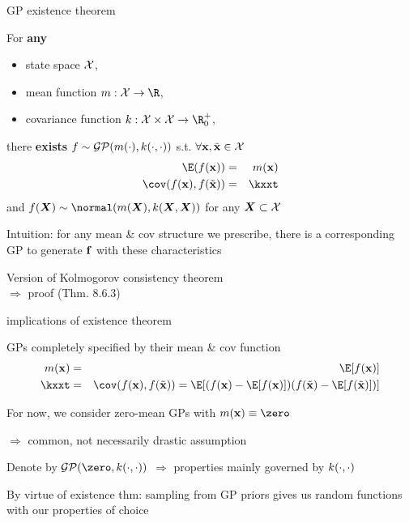 \documentclass[11pt,compress,t,notes=noshow, xcolor=table]{beamer}
\begin{document}

\begin{framei}[sep=L]{GP existence theorem}
\item For \textbf{any} 
\begin{itemize}
\item state space $\mathcal{X}$,
\item mean function $m: \Xspace \rightarrow \R$,
\item covariance function $k: \Xspace \times \Xspace \rightarrow \R^+_0$, 
\end{itemize}
\vfill
there \textbf{exists} $f \sim \mathcal{GP}(m(\cdot), k(\cdot, \cdot))$ s.t. $\forall \mathbf{x}, \tilde{\mathbf{x}} \in \mathcal{X}$
\begin{eqnarray*}
\E(\fx) &=& m(\xv) \\
\cov(\fx, f(\xtil)) &=& \kxxt
\end{eqnarray*}
and $f(\bm{X}) \sim \normal(m(\bm{X}), k(\bm{X}, \bm{X}))$ for any $\bm{X} \subset \mathcal{X}$
\item Intuition: for any mean \& cov structure we prescribe, there is a corresponding GP to generate $\mathbf{f}$ with these characteristics
\item Version of Kolmogorov consistency theorem \\$\Rightarrow$ proof  (Thm. 8.6.3)
\end{framei}

\begin{framei}[sep=L]{implications of existence theorem}
\item GPs completely specified by their mean \& cov function
\begin{eqnarray*}
m(\xv) &=& \E[f(\xv)] \\
\kxxt &=& \cov(\fx, f(\xtil)) = \E [( f(\xv) - \E[f(\xv)]) ( f(\xtil) - \E[f(\xtil)] )]
\end{eqnarray*}
\item For now, we consider zero-mean GPs with $m(\xv) \equiv \zero$ 

$\Rightarrow$ common, not necessarily drastic assumption 
\item Denote by $\GPzk$ $\Rightarrow$ properties mainly governed by $k(\cdot, \cdot)$
\item By virtue of existence thm: sampling from GP priors gives us random functions with our properties of choice
\end{framei}
\end{document}
